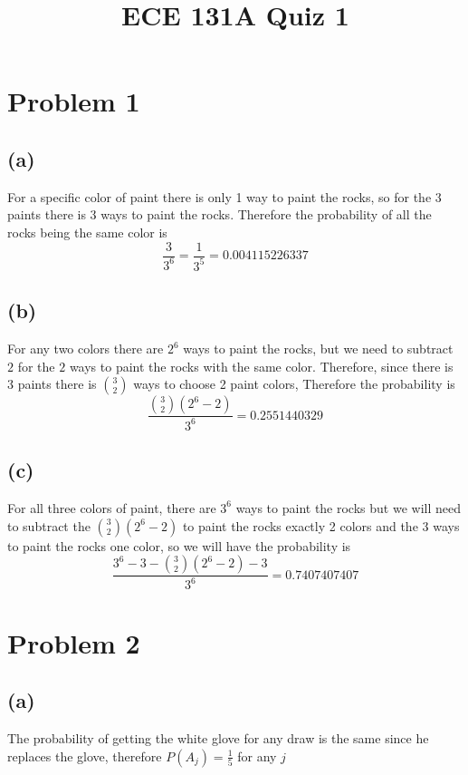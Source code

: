 
\title{ECE 131A Quiz 1}

\maketitle
\section*{Problem 1}
\subsection*{(a)}
For a specific color of paint there is only 1 way to paint the rocks, so for the 3 paints there is 
3 ways to paint the rocks. Therefore the probability of all the rocks being the same color is 
$$\frac{3}{3^6}=\frac{1}{3^5}=\boxed{0.004115226337}$$
\subsection*{(b)}
For any two colors there are $2^6$ ways to paint the rocks, but we need
to subtract $2$ for the $2$ ways to paint the rocks with the same color. 
Therefore, since there is 3 paints there is $3\choose 2$ ways to choose 2 paint
colors, Therefore the probability is
$$\frac{{3\choose 2}(2^6-2)}{3^6}=\boxed{0.2551440329}$$ 
\subsection*{(c)}
For all three colors of paint, there are $3^6$ ways to paint the rocks
but we will need to subtract the ${3\choose 2}(2^6-2)$ to 
paint the rocks exactly 2 colors and the $3$ ways to paint the rocks 
one color, so we will have the probability is 
$$\frac{3^6-3-{3\choose 2}(2^6-2)-3}{3^6}=\boxed{0.7407407407}$$

\section*{Problem 2}
\subsection*{(a)}
The probability of getting the white glove for any
draw is the same since he replaces the glove, 
therefore $P(A_j)=\boxed{\frac{1}{5}}$ for any $j$
